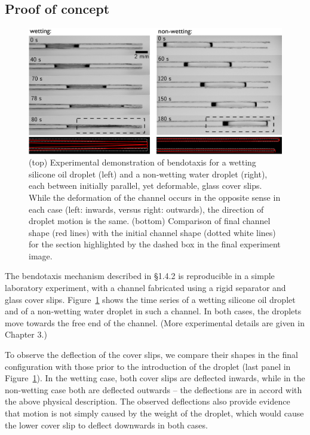\subsection{Proof of concept}
\begin{figure}[t]
\centering
\includegraphics[width = \textwidth]{PoC_expts}
\caption{(top) Experimental demonstration of bendotaxis for a wetting silicone oil droplet (left) and a non-wetting water droplet (right), each between initially parallel, yet deformable, glass cover slips. While the deformation of the channel occurs in the opposite sense in each case (left: inwards, versus right: outwards), the direction of droplet motion is the same. (bottom) Comparison of final channel shape (red lines) with the initial channel shape (dotted white lines) for the section highlighted by the dashed box in the final experiment image.}\label{fig:Ch1:PoC}
\end{figure}


The bendotaxis mechanism described in  \S1.4.2 is reproducible in a simple laboratory experiment, with a channel fabricated using a rigid separator and glass cover slips. Figure~\ref{fig:Ch1:PoC} shows the time series of a wetting silicone oil droplet and of a non-wetting water droplet in such a channel. In both cases, the droplets move towards the free end of the channel. (More experimental details are given in Chapter 3.)

To observe the deflection of the cover slips, we compare their shapes in the final configuration with those prior to the introduction of the droplet (last panel in Figure~\ref{fig:Ch1:PoC}). In the wetting case, both cover slips are deflected inwards, while in the non-wetting case both are deflected outwards -- the deflections are in accord with the above physical description. The observed deflections also provide evidence that motion is not simply caused by the weight of the droplet, which would cause the lower cover slip to deflect downwards in both cases.

